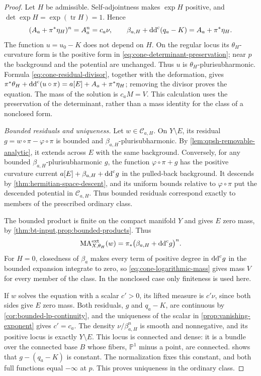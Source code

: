 \begin{proof}
Let $H$ be admissible. Self-adjointness makes $\exp H$ positive, and $\det\exp H=\exp(\operatorname{tr}H)=1$. Hence
\begin{equation}\label{eq:cone-determinant-preservation}
(A_a+\pi^*\eta_H)^n=A_a^n=c_a\nu,\qquad \beta_{a,H}+\mathrm{dd}^{\mathrm{c}}(q_a-K)=A_a+\pi^*\eta_H.
\end{equation}
The function $u=u_0-K$ does not depend on $H$. On the regular locus its $\theta_H$-curvature form is the positive form in \eqref{eq:cone-determinant-preservation}; near $p$ the background and the potential are unchanged. Thus $u$ is $\theta_H$-plurisubharmonic. Formula \eqref{eq:cone-residual-divisor}, together with the deformation, gives $\pi^*\theta_H+\mathrm{dd}^{\mathrm{c}}(u\circ\pi)=a[E]+A_a+\pi^*\eta_H$; removing the divisor proves the equation. The mass of the solution is $c_aM=V$. This calculation uses the preservation of the determinant, rather than a mass identity for the class of a nonclosed form.

\emph{Bounded residuals and uniqueness.} Let $w\in\mathcal C_{a,H}$. On $Y\setminus E$, its residual $g=w\circ\pi-\varphi\circ\pi$ is bounded and $\beta_{a,H}$-plurisubharmonic. By \cref{lem:qpsh-removable-analytic}, it extends across $E$ with the same background. Conversely, for any bounded $\beta_{a,H}$-plurisubharmonic $g$, the function $\varphi\circ\pi+g$ has the positive curvature current $a[E]+\beta_{a,H}+\mathrm{dd}^{\mathrm{c}} g$ in the pulled-back background. It descends by \cref{thm:hermitian-space-descent}, and its uniform bounds relative to $\varphi\circ\pi$ put the descended potential in $\mathcal C_{a,H}$. Thus bounded residuals correspond exactly to members of the prescribed ordinary class.

The bounded product is finite on the compact manifold $Y$ and gives $E$ zero mass, by \cref{thm:bt-input,prop:bounded-products}. Thus
\begin{equation}\label{eq:cone-competitor-pushforward}
\mathrm{MA}^{\mathrm{ext}}_{X,\theta_H}(w)=\pi_*\bigl(\beta_{a,H}+\mathrm{dd}^{\mathrm{c}} g\bigr)^n.
\end{equation}
For $H=0$, closedness of $\beta_a$ makes every term of positive degree in $\mathrm{dd}^{\mathrm{c}} g$ in the bounded expansion integrate to zero, so \eqref{eq:cone-logarithmic-mass} gives mass $V$ for every member of the class. In the nonclosed case only finiteness is used here.

If $w$ solves the equation with a scalar $c'>0$, its lifted measure is $c'\nu$, since both sides give $E$ zero mass. Both residuals, $g$ and $q_a-K$, are continuous by \cref{cor:bounded-lp-continuity}, and the uniqueness of the scalar in \cref{prop:vanishing-exponent} gives $c'=c_a$. The density $\nu/\beta_{a,H}^n$ is smooth and nonnegative, and its positive locus is exactly $Y\setminus E$. This locus is connected and dense: it is a bundle over the connected base $B$ whose fibers, $\mathbb P^1$ minus a point, are connected.  shows that $g-(q_a-K)$ is constant. The normalization fixes this constant, and both full functions equal $-\infty$ at $p$. This proves uniqueness in the ordinary class.


\end{proof}
